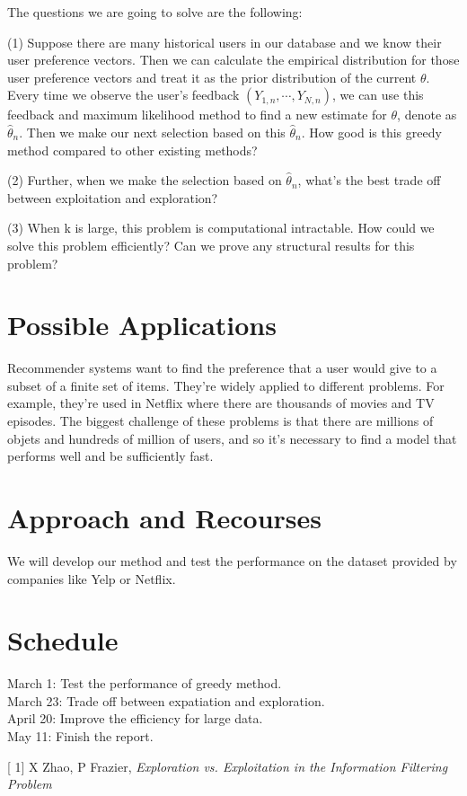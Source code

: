 \documentclass{article}
\renewenvironment{thebibliography}[1]{%
    \begin{oldthebibliography}{#1}%
      \setlength{\parskip}{.3ex}%
      \setlength{\itemsep}{.3ex}%
  }%
  {%
    \end{oldthebibliography}%
  }
\begin{document}
The questions we are going to solve are the following: 

(1) Suppose there are many historical users in our database and we know their user preference vectors. Then we can calculate the empirical distribution for those user preference vectors and treat it as the prior distribution of the current $\theta$. Every time we observe the user's feedback $(Y_{1,n},\cdots,Y_{N,n})$, we can use this feedback and maximum likelihood method to find a new estimate for $\theta$, denote as $\hat{\theta}_{n}$. Then we make our next selection based on this $\hat{\theta}_{n}$. How good is this greedy method compared to other existing methods? 

(2) Further, when we make the selection based on $\hat{\theta}_{n}$, what's the best trade off between exploitation and exploration?

(3) When k is large, this problem is computational intractable. How could we solve this problem efficiently? Can we prove any structural results for this problem?


\section{Possible Applications}

Recommender systems want to find the preference that a user would give to a subset of a finite set of items. They're widely applied to different problems. For example, they're used in Netflix where there are thousands of movies and TV episodes. The biggest challenge of these problems is that there are millions of objets and hundreds of million of users, and so it's necessary to find a model that performs well and be sufficiently fast.


\section{Approach and Recourses}
We will develop our method and test the performance on the dataset provided by companies like Yelp or Netflix.


\section{Schedule}

 March 1: Test the performance of greedy method.\\
 March 23: Trade off between expatiation and exploration.\\
 April 20: Improve the efficiency for large data.\\
 May 11: Finish the report.
 
 
\begin{thebibliography}[1]
X Zhao, P Frazier, \emph{Exploration vs. Exploitation in the Information Filtering Problem}
\end{thebibliography}
\end{document}
